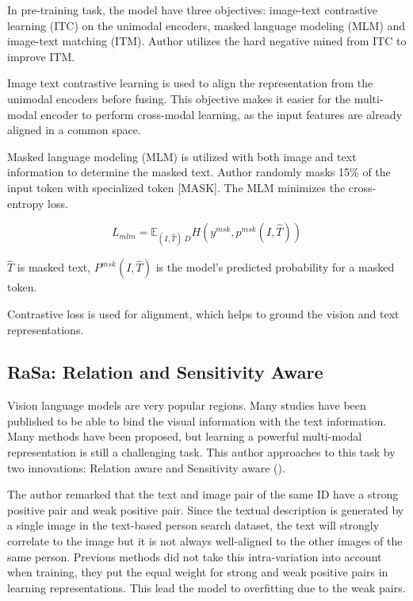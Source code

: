 In pre-training task, the model have three objectives: image-text contrastive learning (ITC) on the unimodal encoders, masked language modeling (MLM) and image-text matching (ITM).
Author utilizes the hard negative mined from ITC to improve ITM.

Image text contrastive learning is used to align the representation from the unimodal encoders before fusing. This objective makes it easier for the multi-modal encoder to perform cross-modal learning, as the input features are already aligned in a common space. 

Masked language modeling (MLM) is utilized with both image and text information to determine the masked text. Author randomly masks 15\% of the input token with specialized token [MASK]. The MLM minimizes the cross-entropy loss.

\begin{displaymath}
    L_{mlm} = \mathbb{E}_{(I,\hat{T})~D}H(y^{msk}, p^{msk}(I,\hat{T}))
\end{displaymath}

$\hat{T}$ is masked text, $P^{msk}(I,\hat{T})$ is the model's predicted probability for a masked token. 

Contrastive loss is used for alignment, which helps to ground the vision and text representations.

\subsection{RaSa: Relation and Sensitivity Aware}

Vision language models are very popular regions. Many studies have been published to be able to bind the visual information with the text information. Many methods have been proposed, but learning a powerful multi-modal representation is still a challenging task. This author approaches to this task by two innovations: Relation aware and Sensitivity aware (\cite{Bai2023RaSaRA}).

The author remarked that the text and image pair of the same ID have a strong positive pair and weak positive pair. Since the textual description is generated by a single image in the text-based person search dataset, the text will strongly correlate to the image but it is not always well-aligned to the other images of the same person. Previous methods did not take this intra-variation into account when training, they put the equal weight for strong and weak positive pairs in learning representations. This lead the model to overfitting due to the weak pairs.

